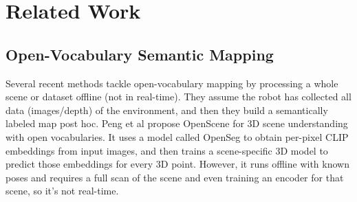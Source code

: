

\section{Related Work}

\subsection{Open-Vocabulary Semantic Mapping}
Several recent methods tackle open-vocabulary mapping by processing a whole scene or dataset offline (not in real-time). They assume the robot has collected all data (images/depth) of the environment, and then they build a semantically labeled map post hoc. Peng et al\cite{peng2023openscene} propose OpenScene for 3D scene understanding with open vocabularies. It uses a model called OpenSeg\cite{YuanFHZCW21} to obtain per-pixel CLIP embeddings\cite{radford2021learning} from input images, and then trains a scene-specific 3D model to predict those embeddings for every 3D point. However,  it runs offline with known poses and requires a full scan of the scene and even training an encoder for that scene, so it’s not real-time.


